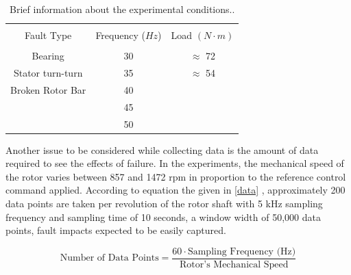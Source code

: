 \begin{table}[h]
	{\setlength{\tabcolsep}{12pt}
		\caption{Brief information about the experimental conditions..}
		\begin{center}
			\vspace{-6mm}
			\begin{tabular}{ccc}
				\hline \\[-2.45ex] \hline \\[-2.1ex]
				Fault Type & Frequency ($Hz$) & Load $(N\cdot m)$ \\
				\hline \\[-1.8ex]
				Bearing & 30 & $\approx$ 72  \\
				Stator turn-turn & 35 & $\approx$ 54  \\
				Broken Rotor Bar & 40 &  \\
				& 45 &   \\
				& 50 &   \\
				\hline
			\end{tabular}
			\vspace{-6mm}
		\end{center}
		\label{Table3.3}}
\end{table}

Another issue to be considered while collecting data is the amount of data required to see the effects of failure. In the experiments, the mechanical speed of the rotor varies between 857 and 1472 rpm in proportion to the reference control command applied. According to equation the given in \ref{data} \cite{shenfield2020novel}, approximately 200 data points are taken per revolution of the rotor shaft with 5 kHz sampling frequency and sampling time of 10 seconds, a window width of 50,000 data points, fault impacts expected to be easily captured.

\begin{equation}
	\text{Number of Data Points} = \displaystyle \frac{60 \cdot \text{Sampling Frequency (Hz)}}{\text{Rotor's Mechanical Speed}}
	\label{data}
\end{equation}

